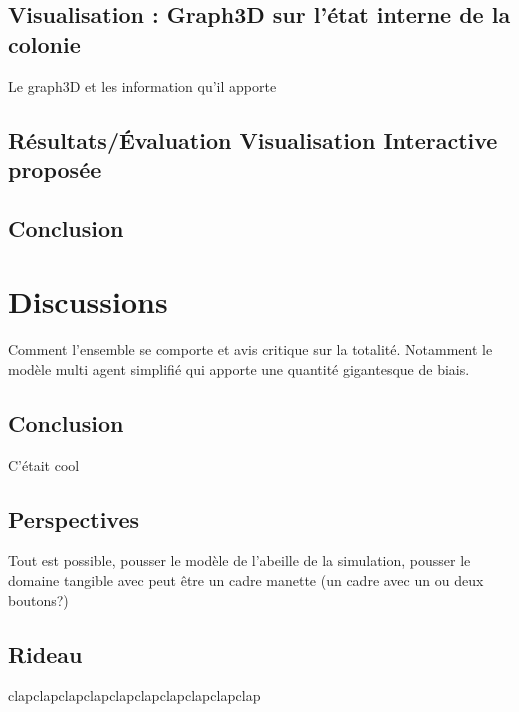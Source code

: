 \documentclass[11pt,a4paper]{report}
\begin{document}
	\section{Visualisation : Graph3D sur l'état interne de la colonie}
		Le graph3D et les information qu'il apporte
	\section{Résultats/Évaluation Visualisation Interactive proposée}
	
			
	\section*{Conclusion}
	
	
	
	
\chapter*{Discussions}
	Comment l'ensemble se comporte et avis critique sur la totalité. Notamment le modèle multi agent simplifié qui apporte une quantité gigantesque de biais.
\section*{Conclusion}
	C'était cool
\section*{Perspectives}
	Tout est possible, pousser le modèle de l'abeille de la simulation, pousser le domaine tangible avec peut être un cadre manette (un cadre avec un ou deux boutons?)
\section*{Rideau}
	clapclapclapclapclapclapclapclapclapclap
\end{document}
